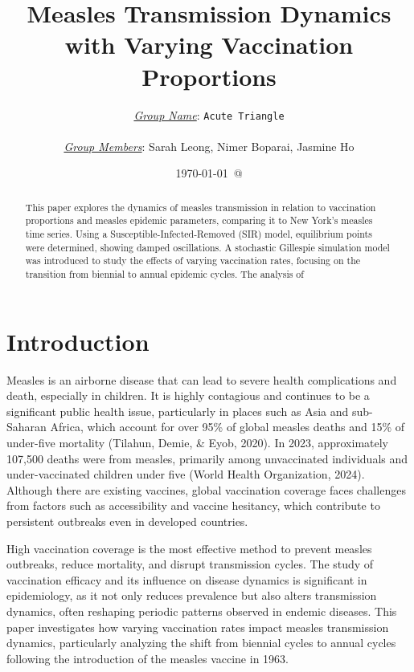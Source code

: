 \documentclass[12pt]{article}
\title{Measles Transmission Dynamics with Varying Vaccination Proportions}
\author{\underline{\emph{Group Name}}: \texttt{{\color{blue}Acute Triangle}}\\
{}\\
\underline{\emph{Group Members}}: {\color{blue}Sarah Leong, Nimer Boparai, Jasmine Ho}}
\date{\today\ @ \thistime}
\begin{document}
\maketitle


\begin{abstract}
This paper explores the dynamics of measles transmission in relation to vaccination proportions and measles epidemic parameters, comparing it to New York's measles time series. Using a Susceptible-Infected-Removed (SIR) model, equilibrium points were determined, showing damped oscillations. A stochastic Gillespie simulation model was introduced to study the effects of varying vaccination rates, focusing on the transition from biennial to annual epidemic cycles. The analysis of 
\end{abstract}

\tableofcontents

\section{Introduction}


\indent Measles is an airborne disease that can lead to severe health complications and death, especially in children. It is highly contagious and continues to be a significant public health issue, particularly in places such as Asia and sub-Saharan Africa, which account for over 95\% of global measles deaths and 15\% of under-five mortality (Tilahun, Demie, \& Eyob, 2020). In 2023, approximately 107,500 deaths were from measles, primarily among unvaccinated individuals and under-vaccinated children under five (World Health Organization, 2024). Although there are existing vaccines, global vaccination coverage faces challenges from factors such as accessibility and vaccine hesitancy, which contribute to persistent outbreaks even in developed countries.

\indent High vaccination coverage is the most effective method to prevent measles outbreaks, reduce mortality, and disrupt transmission cycles. The study of vaccination efficacy and its influence on disease dynamics is significant in epidemiology, as it not only reduces prevalence but also alters transmission dynamics, often reshaping periodic patterns observed in endemic diseases. This paper investigates how varying vaccination rates impact measles transmission dynamics, particularly analyzing the shift from biennial cycles to annual cycles following the introduction of the measles vaccine in 1963.
\end{document}
